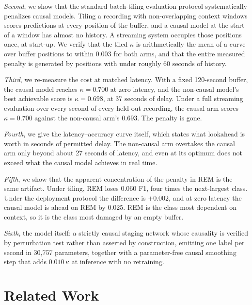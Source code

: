 \documentclass[conference]{IEEEtran}
\begin{document}
\emph{Second}, we show that the standard batch-tiling evaluation protocol systematically
penalizes causal models. Tiling a recording with non-overlapping context windows scores
predictions at every position of the buffer, and a causal model at the start of a window
has almost no history. A streaming system occupies those positions once, at start-up. We
verify that the tiled $\kappa$ is arithmetically the mean of a curve over buffer positions
to within $0.003$ for both arms, and that the entire measured penalty is generated by
positions with under roughly 60 seconds of history.

\emph{Third}, we re-measure the cost at matched latency. With a fixed 120-second buffer,
the causal model reaches $\kappa = 0.700$ at zero latency, and the non-causal model's best
achievable score is $\kappa = 0.698$, at 37 seconds of delay. Under a full streaming
evaluation over every second of every held-out recording, the causal arm scores
$\kappa = 0.700$ against the non-causal arm's $0.693$. The penalty is gone.

\emph{Fourth}, we give the latency--accuracy curve itself, which states what lookahead is
worth in seconds of permitted delay. The non-causal arm overtakes the causal arm only
beyond about 27 seconds of latency, and even at its optimum does not exceed what the
causal model achieves in real time.

\emph{Fifth}, we show that the apparent concentration of the penalty in REM is the same
artifact. Under tiling, REM loses $0.060$ F1, four times the next-largest class. Under the
deployment protocol the difference is $+0.002$, and at zero latency the causal model is
ahead on REM by $0.025$. REM is the class most dependent on context, so it is the class
most damaged by an empty buffer.

\emph{Sixth}, the model itself: a strictly causal staging network whose causality is
verified by perturbation test rather than asserted by construction, emitting one label per
second in 30{,}757 parameters, together with a parameter-free causal smoothing step that
adds $0.010\,\kappa$ at inference with no retraining.

\section{Related Work}
\end{document}

